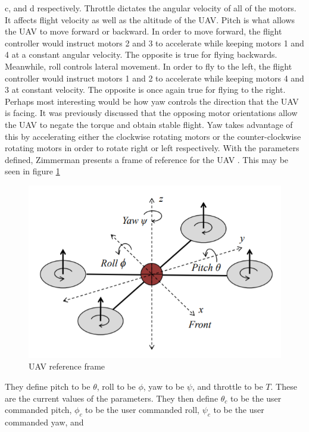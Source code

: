 \documentclass[english]{upeeei}
\begin{document}
c, and d respectively. Throttle dictates the angular velocity of all of the motors. It affects flight velocity as well as the altitude of the
UAV. Pitch is what allows the UAV to move forward or backward. In order to move forward, the flight controller would instruct motors 2 and 3
to accelerate while keeping motors 1 and 4 at a constant angular velocity. The opposite is true for flying backwards. Meanwhile, roll controls
lateral movement. In order to fly to the left, the flight controller would instruct motors 1 and 2 to accelerate while keeping motors 4 and 3
at constant velocity. The opposite is once again true for flying to the right. Perhaps most interesting would be how yaw controls the direction
that the UAV is facing. It was previously discussed that the opposing motor orientations allow the UAV to negate the torque and obtain stable
flight. Yaw takes advantage of this by accelerating either the clockwise rotating motors or the counter-clockwise rotating motors in order to
rotate right or left respectively.
\newline
\newline
With the parameters defined, Zimmerman presents a frame of reference for the UAV \cite{zimmerman2016}. This may be seen in figure \ref{fig:ref_frame}
\begin{figure}[h]
    \centering
    \includegraphics[scale=0.5]{images/quad_ref_frame.PNG}
    \caption{UAV reference frame \cite{zimmerman2016}}
    \label{fig:ref_frame}
\end{figure}
They define pitch to be $\theta$, roll to be $\phi$, yaw to be $\psi$, and throttle to be $T$. These are the current values of the parameters.
They then define $\theta_c$ to be the user commanded pitch, $\phi_c$ to be the user commanded roll, $\psi_c$ to be the user commanded yaw, and
\end{document}
